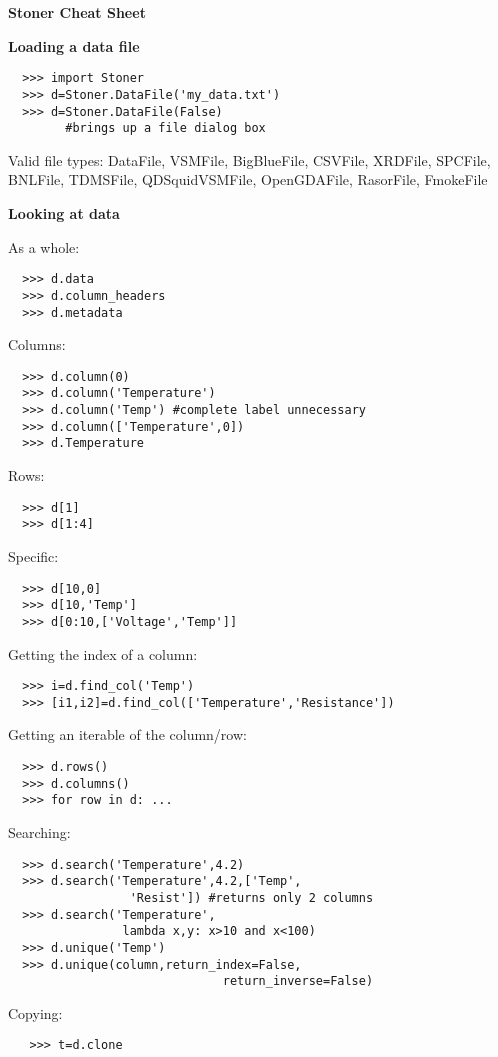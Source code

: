 \documentclass[a4paper,9pt,threecolumn,landscape]{scrartcl}
\begin{document}
\setlength{\parindent}{0pt}
\columnsep 1cm
\columnseprule 0.4pt
\begin{multicols}{3}
{\huge \textbf{Stoner Cheat Sheet}}
\vspace{0.5cm}

\textbf {Loading a data file}
\begin{verbatim}
  >>> import Stoner
  >>> d=Stoner.DataFile('my_data.txt')
  >>> d=Stoner.DataFile(False) 
        #brings up a file dialog box
\end{verbatim}
Valid file types:
DataFile,
VSMFile,
BigBlueFile,
CSVFile,
XRDFile,
SPCFile,
BNLFile,
TDMSFile,
QDSquidVSMFile,
OpenGDAFile,
RasorFile,
FmokeFile

\vspace{0.5cm}
\textbf {Looking at data}
\vspace{0.2cm}

\normalfont As a whole:
\begin{verbatim}
  >>> d.data
  >>> d.column_headers
  >>> d.metadata
\end{verbatim}
Columns:
\begin{verbatim}
  >>> d.column(0)
  >>> d.column('Temperature')
  >>> d.column('Temp') #complete label unnecessary
  >>> d.column(['Temperature',0])
  >>> d.Temperature
\end{verbatim}
Rows:
\begin{verbatim}
  >>> d[1]
  >>> d[1:4]
\end{verbatim}
Specific:
\begin{verbatim}
  >>> d[10,0]
  >>> d[10,'Temp']
  >>> d[0:10,['Voltage','Temp']]
\end{verbatim}
Getting the index of a column:
\begin{verbatim}
  >>> i=d.find_col('Temp')
  >>> [i1,i2]=d.find_col(['Temperature','Resistance'])
\end{verbatim}
Getting an iterable of the column/row:
\begin{verbatim}
  >>> d.rows()
  >>> d.columns()
  >>> for row in d: ...
\end{verbatim}
Searching:
\begin{verbatim}
  >>> d.search('Temperature',4.2)
  >>> d.search('Temperature',4.2,['Temp',
                 'Resist']) #returns only 2 columns
  >>> d.search('Temperature',
  				lambda x,y: x>10 and x<100)
  >>> d.unique('Temp')
  >>> d.unique(column,return_index=False, 
                              return_inverse=False)          
\end{verbatim}
Copying:
\begin{verbatim}
   >>> t=d.clone
\end{verbatim}


\end{multicols}
\end{document}
